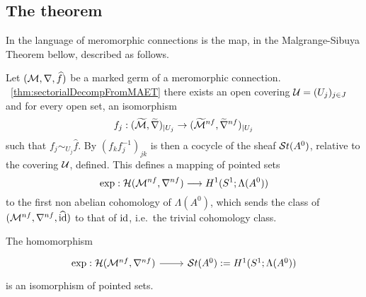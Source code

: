 \begin{defn}
\begin{comment}
      The sheaf $\Aut^{<0}(\tilde\sM^{nf})$ corresponds to our $\Lambda(A^0)$.
    \end{s-rem}
  \end{comment}
  \fi
\end{defn}

\subsection{The theorem}

In the language of meromorphic connections is the map, in the Malgrange-Sibuya
Theorem bellow, described as follows.

Let $(\mathcal{M},\nabla,\widehat f)$ be a marked germ of a  meromorphic connection.
~\ref{thm:sectorialDecompFromMAET} there exists an open
covering $\mathcal{U}=(U_j)_{j\in J}$ and for every open set, an isomorphism
\[
  f_j:(\widetilde{\mathcal{M}},\widetilde\nabla)_{|U_j}
  \to(\widetilde{\mathcal{M}}^{nf},\widetilde\nabla^{nf})_{|U_j}
\]
such that $f_j\sim_{U_j}\hat f$.
By $(f_kf_j^{-1})_{jk}$ is then a cocycle of the sheaf $\mathcal{S}{}t(A^0)$, relative
to the covering $\mathcal{U}$, defined.
This defines a mapping of pointed sets
\[
  \exp:\mathcal{H}(\mathcal{M}^{nf},\nabla^{nf})\longrightarrow H^1(S^1;\Lambda(A^0))
\]
to the first non abelian cohomology of $\Lambda(A^0)$, which sends the class of
$(\mathcal{M}^{nf},\nabla^{nf},\widehat{\operatorname{id}})$ to that of $\operatorname{id}$, i.e.\ the trivial cohomology
class.

\begin{center}
  \begin{minipage}[t]{0.8\textwidth}
    \begin{tthm} \label{thm:mainThm1MeromVersion}
      The homomorphism
      \[ \begin{tikzcd}
          \exp:\cH(\cM^{nf},\nabla^{nf}) \rar& \St(A^0):=H^1(S^1;\Lambda(A^0))
      \end{tikzcd} \]
      is an isomorphism of pointed sets.
    \end{tthm}
  \end{minipage}
\end{center}

